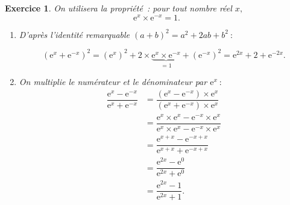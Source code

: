 \documentclass[10pt]{article}
\newtheorem{exo}{Exercice}
\begin{document}
\begin{exo}

On utilisera la propriété~: pour tout nombre réel $x,$\[\text{e}^x\times \text{e}^{-x}=1.\]


\begin{enumerate}
\item D'après l'identité remarquable $(a+b)^2=a^2+2ab+b^2~:$



\[\left(\text{e}^{x}+ \text{e}^{-x}\right)^2=\left(\text{e}^{x}\right)^2+2\times \underbrace{\text{e}^{x}\times \text{e}^{-x}}_{=1}+\left( \text{e}^{-x}\right)^2=\text{e}^{2x}+2+\text{e}^{-2x}.\]
\item On multiplie le numérateur et le dénominateur par $\text{e}^x~:$
\begin{align*}
\dfrac{\text{e}^{x}-\text{e}^{-x}}{\text{e}^x+\text{e}^{-x}}
&=\dfrac{\left(\text{e}^{x}-\text{e}^{-x}\right)\times\text{e}^x}{\left(\text{e}^{x}+\text{e}^{-x}\right)\times\text{e}^x}\\
&=\dfrac{\text{e}^{x}\times \text{e}^{x}-\text{e}^{-x}\times \text{e}^{x}}{\text{e}^{x}\times \text{e}^{x}-\text{e}^{-x}\times \text{e}^{x}}\\
&=\dfrac{\text{e}^{x+x}-\text{e}^{-x+x}}{\text{e}^{x+x}+\text{e}^{-x+x}}\\
&=\dfrac{\text{e}^{2x}-\text{e}^{0}}{\text{e}^{2x}+\text{e}^{0}}\\
&=\dfrac{\text{e}^{2x}-1}{\text{e}^{2x}+1}.
\end{align*}
\end{enumerate}


\end{exo}
\end{document}
